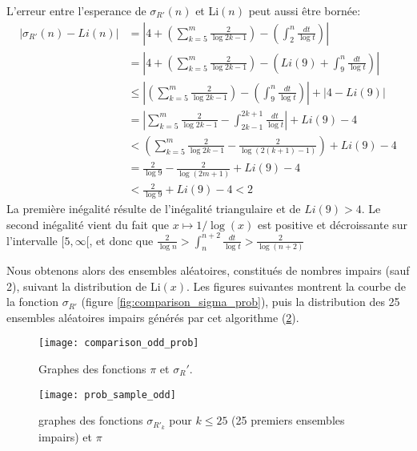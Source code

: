 \documentclass[../main.tex]{report}
\begin{document}
L'erreur entre l'esperance de $\sigma_{R'}(n)$ et Li$(n)$ peut aussi être bornée:
\[ \begin{aligned}
\left| \sigma_{R'}(n) - Li(n) \right|
&= \left| 4 + (\sum_{k=5}^m \frac{2}{\log 2k-1})
		- (\int_2^n \frac{dt}{\log t} ) \right| \\
&= \left| 4 + (\sum_{k=5}^m \frac{2}{\log 2k-1})
		- (Li(9) + \int_9^n \frac{dt}{\log t} ) \right| \\
&\leq \left| (\sum_{k=5}^m \frac{2}{\log 2k-1})
		- (\int_9^n \frac{dt}{\log t} ) \right| + \left| 4 - Li(9)\right| \\
&= \left| \sum_{k=5}^m \frac{2}{\log 2k - 1} - 
		\int_{2k-1}^{2k+1} \frac{dt}{\log t} \right| + Li(9) - 4 \\ 
&< (\sum_{k=5}^m \frac{2}{\log 2k-1} - \frac{2}{\log{(2(k+1)-1)}})
		+ Li(9) - 4 \\
&= \frac{2}{\log 9} - \frac{2}{\log (2m + 1)} + Li(9) - 4 \\
&< \frac{2}{\log 9} + Li(9) - 4	< 2		
\end{aligned} \]
La première inégalité résulte de l'inégalité triangulaire et de $Li(9) > 4$. Le second inégalité vient du fait que $x \mapsto 1/\log(x)$ est positive et décroissante sur l'intervalle $[5,\infty[$, 
et donc que $\frac{2}{\log n} > \int_n^{n+2}\frac{dt}{\log t} > \frac{2}{\log (n+2)}$

Nous obtenons alors des ensembles aléatoires, constitués de nombres impairs (sauf 2), suivant la distribution de Li$(x)$. 
Les figures suivantes montrent la courbe de la fonction $\sigma_{R'}$ (figure \ref{fig:comparison_sigma_prob}), puis la distribution des 25 ensembles aléatoires impairs générés par cet algorithme (\ref{fig:prob_sample_odd}).

\begin{figure}[H]
\centering
\texttt{[image: comparison\_odd\_prob]}
\caption{Graphes des fonctions $\pi$ et $\sigma_R'$.}
\label{fig:comparison_odd_prob}
\end{figure}

\begin{figure}[H]
	\centering
	\texttt{[image: prob\_sample\_odd]}
	\caption{graphes des fonctions $\sigma_{R'_k}$ pour $k \leq 25$ (25 premiers ensembles impairs) et $\pi$}
	\label{fig:prob_sample_odd}
\end{figure}
\end{document}
